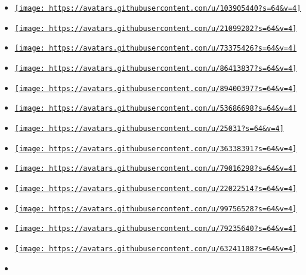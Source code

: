 \begin{itemize}
\item
  \href{https://github.com/Tom4sCruz}{\texttt{[image: https://avatars.githubusercontent.com/u/103905440?s=64\&v=4]}}
\item
  \href{https://github.com/UARTman}{\texttt{[image: https://avatars.githubusercontent.com/u/21099202?s=64\&v=4]}}
\item
  \href{https://github.com/YDX-2147483647}{\texttt{[image: https://avatars.githubusercontent.com/u/73375426?s=64\&v=4]}}
\item
  \href{https://github.com/aaron-jack-manning}{\texttt{[image: https://avatars.githubusercontent.com/u/86413837?s=64\&v=4]}}
\item
  \href{https://github.com/arbrauns}{\texttt{[image: https://avatars.githubusercontent.com/u/89400397?s=64\&v=4]}}
\item
  \href{https://github.com/astrale-sharp}{\texttt{[image: https://avatars.githubusercontent.com/u/53686698?s=64\&v=4]}}
\item
  \href{https://github.com/bk}{\texttt{[image: https://avatars.githubusercontent.com/u/25031?s=64\&v=4]}}
\item
  \href{https://github.com/chicoferreira}{\texttt{[image: https://avatars.githubusercontent.com/u/36338391?s=64\&v=4]}}
\item
  \href{https://github.com/ctmbl}{\texttt{[image: https://avatars.githubusercontent.com/u/79016298?s=64\&v=4]}}
\item
  \href{https://github.com/danielfleischer}{\texttt{[image: https://avatars.githubusercontent.com/u/22022514?s=64\&v=4]}}
\item
  \href{https://github.com/etiennecollin}{\texttt{[image: https://avatars.githubusercontent.com/u/99756528?s=64\&v=4]}}
\item
  \href{https://github.com/flauschpantoffel}{\texttt{[image: https://avatars.githubusercontent.com/u/79235640?s=64\&v=4]}}
\item
  \href{https://github.com/fynsta}{\texttt{[image: https://avatars.githubusercontent.com/u/63241108?s=64\&v=4]}}
\item

\end{itemize}
